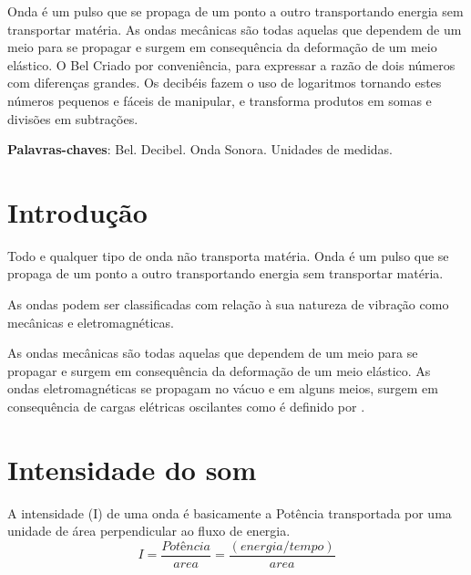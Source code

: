 \documentclass[
	article,			%
	11pt,				%
	oneside,			%
	a4paper,			%
	english,			%
	brazil,				%
	sumario=tradicional
	]{abntex2}
\begin{document}
\frenchspacing 


\maketitle

\begin{resumoumacoluna}
    Onda é um pulso que se propaga de um ponto a outro transportando energia sem transportar matéria. As ondas mecânicas são todas aquelas que dependem de um meio para se propagar e surgem em consequência da deformação de um meio elástico.
    O Bel Criado por conveniência, para expressar a razão de dois números com diferenças grandes.
    Os decibéis fazem o uso de logaritmos tornando estes números pequenos e fáceis de manipular, e transforma produtos em somas e divisões em subtrações.
 
 \vspace{\onelineskip}
 
 \noindent
 \textbf{Palavras-chaves}: Bel. Decibel. Onda Sonora. Unidades de medidas.
\end{resumoumacoluna}

\textual

\section*{Introdução}

Todo e qualquer tipo de onda não transporta matéria. Onda é um pulso que se propaga de um ponto a outro transportando energia sem transportar matéria.

As ondas podem ser classificadas com relação à sua natureza de vibração como mecânicas e eletromagnéticas.

As ondas mecânicas são todas aquelas que dependem de um meio para se propagar e surgem em consequência da deformação de um meio elástico.
As ondas eletromagnéticas se propagam no vácuo e em alguns meios, surgem em consequência de cargas elétricas oscilantes como é definido por .

\section{Intensidade do som}
A intensidade (I) de uma onda é basicamente a Potência transportada por uma unidade de área perpendicular ao
fluxo de energia.
$$I = \frac{Potência}{area} = \frac{(energia / tempo)} {area}$$
\end{document}
